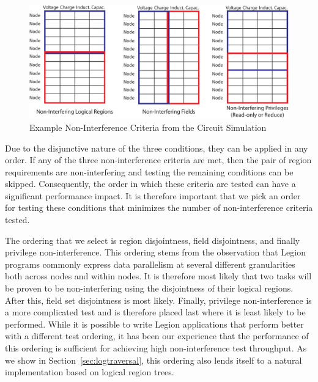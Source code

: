 \begin{figure}[h]
\centering
\includegraphics[scale=0.7]{figs/NonInterfering.pdf}
\caption{Example Non-Interference Criteria from the Circuit Simulation
\label{fig:noncases}}
\end{figure}

Due to the disjunctive nature of the three conditions,
they can be applied in any order.  If any of the
three non-interference criteria are met, then the 
pair of region requirements are non-interfering 
and testing the remaining conditions can be skipped. 
Consequently, the order in which these criteria are
tested can have a significant performance impact.
It is therefore important that we pick an order for
testing these conditions that minimizes the number
of non-interference criteria tested.

The ordering that we select is region disjointness,
field disjointness, and finally privilege 
non-interference.  This ordering stems from the 
observation that Legion programs commonly express 
data parallelism at several different granularities 
both across nodes and within nodes. It is therefore 
most likely that two tasks will be proven to be 
non-interfering using the disjointness of their 
logical regions. After this, field set disjointness 
is most likely.  Finally, privilege non-interference 
is a more complicated test and is therefore placed 
last where it is least likely to be performed.  
While it is possible to write Legion applications that
perform better with a different test ordering, it 
has been our experience that the performance of this 
ordering is sufficient for achieving high 
non-interference test throughput. As we show in 
Section~\ref{sec:logtraversal}, this ordering also
lends itself to a natural implementation based
on logical region trees.

